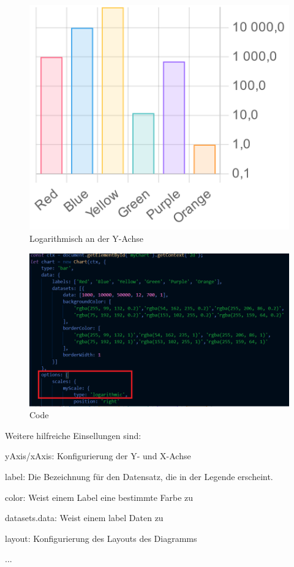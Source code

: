 \begin{figure}[H]
  \centering
  \includegraphics[scale=0.3]{pics/logChart.png}
  \caption{Logarithmisch an der Y-Achse}
\end{figure}
\begin{figure}[H]
  \centering
  \includegraphics[scale=0.7]{pics/logCode.png}
  \caption{Code}
\end{figure}


Weitere hilfreiche Einsellungen sind:
\begin{compactitem}
  \item yAxis/xAxis: Konfigurierung der Y- und X-Achse
  \item label: Die Bezeichnung für den Datensatz, die in der Legende erscheint.
  \item color: Weist einem Label eine bestimmte Farbe zu
  \item datasets.data: Weist einem label Daten zu
  \item layout: Konfigurierung des Layouts des Diagramms
  \item ...
\end{compactitem}

